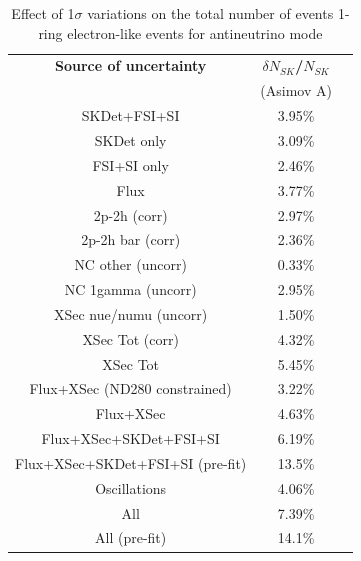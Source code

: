 \begin{table}[htb]
\centering
\begin{tabular}{| c | c | c |}
\hline
  {\bf Source of uncertainty}    & \multicolumn{1}{c|}{{\bf ${\delta}N_{SK}$/$N_{SK}$}}\\
                                 & \multicolumn{1}{c|}{(Asimov A)}\\

\hline
\hline  
SKDet+FSI+SI                   & 3.95\%                        \\
SKDet only                   & 3.09\%                        \\
FSI+SI only                   & 2.46\%                        \\
\hline
  Flux                           & 3.77\%                        \\
\hline
\hline
  2p-2h (corr)                     & 2.97\%                        \\
  2p-2h bar (corr)                  & 2.36\%                        \\
  NC other (uncorr)              & 0.33\%                        \\
  NC 1gamma (uncorr)             & 2.95\%                        \\
  XSec nue/numu (uncorr)                 & 1.50\%                        \\
\hline
  XSec Tot (corr)                  & 4.32\%                        \\
  XSec Tot                       & 5.45\%                        \\
\hline
\hline
  Flux+XSec (ND280 constrained)                      & 3.22\%                        \\
  Flux+XSec                      & 4.63\%                        \\
\hline
  Flux+XSec+SKDet+FSI+SI         & 6.19\%                        \\
  Flux+XSec+SKDet+FSI+SI (pre-fit)         & 13.5\%                        \\
\hline
\hline
  Oscillations                   & 4.06\%                        \\
\hline
\hline
  All                            & 7.39\%                        \\
      All (pre-fit) 		& 14.1\%				\\
\hline
\hline
\end{tabular}
\caption{
 Effect of 1$\sigma$ variations on the total number of events 1-ring electron-like events for antineutrino mode
}
\end{table}
